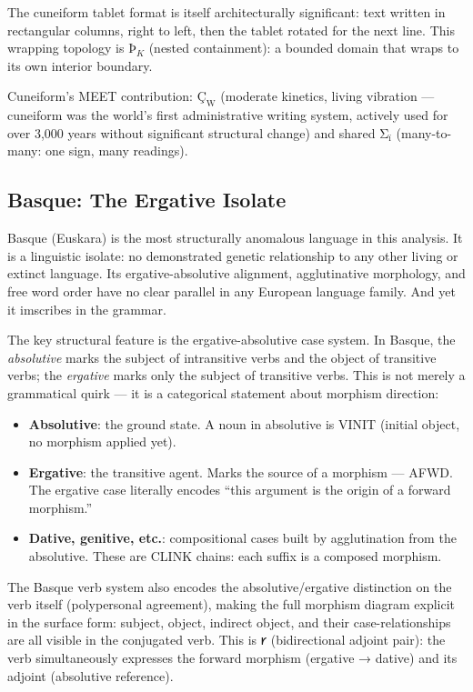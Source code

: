 \documentclass[12pt,a4paper]{article}
\begin{document}
The cuneiform tablet format is itself architecturally significant: text written in rectangular columns, right to left, then the tablet rotated for the next line. This wrapping topology is $\text{Þ}_K$ (nested containment): a bounded domain that wraps to its own interior boundary.

Cuneiform's MEET contribution: $\text{Ç}_\text{W}$ (moderate kinetics, living vibration --- cuneiform was the world's first administrative writing system, actively used for over 3,000 years without significant structural change) and shared $\text{Σ}_\text{ï}$ (many-to-many: one sign, many readings).

\subsection{Basque: The Ergative Isolate}

Basque (Euskara) is the most structurally anomalous language in this analysis. It is a linguistic isolate: no demonstrated genetic relationship to any other living or extinct language. Its ergative-absolutive alignment, agglutinative morphology, and free word order have no clear parallel in any European language family. And yet it imscribes in the grammar.

The key structural feature is the ergative-absolutive case system. In Basque, the \emph{absolutive} marks the subject of intransitive verbs and the object of transitive verbs; the \emph{ergative} marks only the subject of transitive verbs. This is not merely a grammatical quirk --- it is a categorical statement about morphism direction:

\begin{itemize}
\item \textbf{Absolutive}: the ground state. A noun in absolutive is VINIT (initial object, no morphism applied yet).
\item \textbf{Ergative}: the transitive agent. Marks the source of a morphism --- AFWD. The ergative case literally encodes ``this argument is the origin of a forward morphism.''
\item \textbf{Dative, genitive, etc.}: compositional cases built by agglutination from the absolutive. These are CLINK chains: each suffix is a composed morphism.
\end{itemize}

The Basque verb system also encodes the absolutive/ergative distinction on the verb itself (polypersonal agreement), making the full morphism diagram explicit in the surface form: subject, object, indirect object, and their case-relationships are all visible in the conjugated verb. This is 𐑾 (bidirectional adjoint pair): the verb simultaneously expresses the forward morphism (ergative → dative) and its adjoint (absolutive reference).
\end{document}
